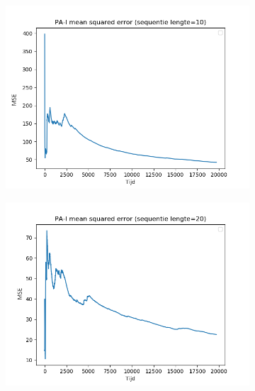 \begin{figure}[t!]
\centering
\begin{subfigure}{.49\textwidth}
  \centering
  \includegraphics[width=\linewidth]{images/evaluatie/seqlen10.png}
\end{subfigure}
\begin{subfigure}{.49\textwidth}
  \centering
  \includegraphics[width=\linewidth]{images/evaluatie/seqlen20.png}
\end{subfigure}
\begin{subfigure}{.49\textwidth}
  \centering

\end{subfigure}
\end{figure}
